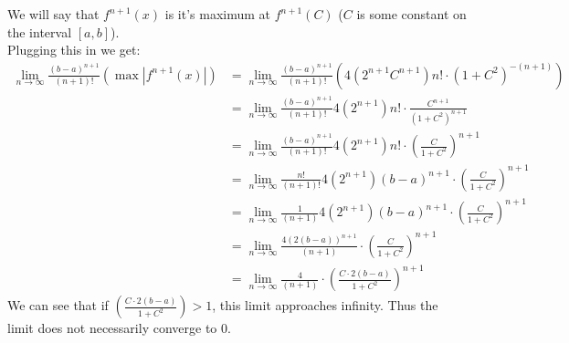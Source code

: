 \documentclass{article}
\begin{document}
\begin{enumerate}
We will say that $f^{n+1}(x)$ is it's maximum at $f^{n+1}(C)$ ($C$ is some constant on the interval $[a,b]$). \\
Plugging this in we get:\\
\begin{align*}
\lim_{n \rightarrow \infty}\frac{(b-a)^{n+1}}{(n+1)!}(\max |f^{n+1}(x)|) &= \lim_{n \rightarrow \infty}\frac{(b-a)^{n+1}}{(n+1)!}(4(2^{n+1}C^{n+1})n! \cdot (1 + C^2)^{-(n+1)})\\
&= \lim_{n \rightarrow \infty}\frac{(b-a)^{n+1}}{(n+1)!}4(2^{n+1})n! \cdot \frac{C^{n+1}}{(1 + C^2)^{n+1}}\\
&= \lim_{n \rightarrow \infty}\frac{(b-a)^{n+1}}{(n+1)!}4(2^{n+1})n! \cdot (\frac{C}{1 + C^2})^{n+1}\\
&=\lim_{n \rightarrow \infty}\frac{n!}{(n+1)!}4(2^{n+1})(b-a)^{n+1} \cdot  (\frac{C}{1 + C^2})^{n+1}\\
&=  \lim_{n \rightarrow \infty}\frac{1}{(n+1)}4(2^{n+1})(b-a)^{n+1} \cdot  (\frac{C}{1 + C^2})^{n+1}\\
&=  \lim_{n \rightarrow \infty}\frac{4(2(b-a))^{n+1}}{(n+1)} \cdot  (\frac{C}{1 + C^2})^{n+1}\\
&= \lim_{n \rightarrow \infty}\frac{4}{(n+1)} \cdot  (\frac{C \cdot 2(b-a)}{1 + C^2} )^{n+1}
\end{align*}
We can see that if $(\frac{C \cdot 2(b-a)}{1 + C^2} ) > 1$, this limit approaches infinity. Thus the limit does not necessarily converge to 0. 

\end{enumerate}
\end{document}
